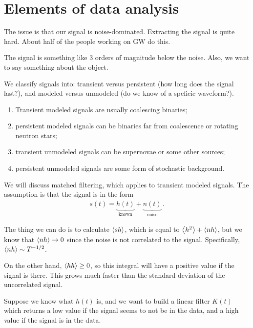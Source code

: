 \documentclass[main.tex]{subfiles}
\begin{document}
\section{Elements of data analysis}


The issue is that our signal is noise-dominated. 
Extracting the signal is quite hard. About half of the people working on GW do this. 

The signal is something like 3 orders of magnitude below the noise.
Also, we want to say something about the object. 

We classify signals into: transient versus persistent (how long does the signal last?), and modeled versus unmodeled (do we know of a speficic waveform?). 
\begin{enumerate}
    \item Transient modeled signals are usually coalescing binaries;
    \item persistent modeled signals can be binaries far from coalescence or rotating neutron stars;
    \item transient unmodeled signals can be supernovae or some other sources;
    \item persistent unmodeled signals are some form of stochastic background.  
\end{enumerate}

We will discuss matched filtering, which applies to transient modeled signals. The assumption is that the signal is in the form 
%
\begin{align}
s(t) = \underbrace{h(t)}_{\text{known}} + \underbrace{n(t)}_{\text{noise}}
\,.
\end{align}

The thing we can do is to calculate \(\expval{s h}\), which is equal to \(\expval{h^2} + \expval{nh}\), but we know that \(\expval{nh} \to 0\) since the noise is not correlated to the signal. Specifically, \(\expval{nh} \sim T^{-1/2}\).

On the other hand, \(\expval{hh} \geq 0\), so this integral will have a positive value if the signal is there.
This grows much faster than the standard deviation of the uncorrelated signal. 

Suppose we know what \(h(t)\) is, and we want to build a linear filter \(K(t)\) which returns a low value if the signal seems to not be in the data, and a high value if the signal is in the data.
\end{document}
